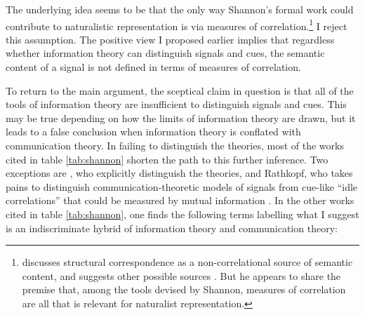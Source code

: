 \documentclass[12pt]{article}
\begin{document}


The underlying idea seems to be that the only way Shannon's formal work could contribute to naturalistic representation is via measures of correlation.\footnote{\citet[$\S$5]{shea2018representation} discusses structural correspondence as a non-correlational source of semantic content, and suggests other possible sources \citep[p. 76 n. 1]{shea2018representation}. But he appears to share the premise that, among the tools devised by Shannon, measures of correlation are all that is relevant for naturalist representation.}
I reject this assumption.
The positive view I proposed earlier implies that regardless whether information theory can distinguish signals and cues, the semantic content of a signal is not defined in terms of measures of correlation.

To return to the main argument, the sceptical claim in question is that all of the tools of information theory are insufficient to distinguish signals and cues.
This may be true depending on how the limits of information theory are drawn, but it leads to a false conclusion when information theory is conflated with communication theory.
In failing to distinguish the theories, most of the works cited in table \ref{tab:shannon} shorten the path to this further inference.
Two exceptions are \citet[17-20]{piccinini2011information}, who explicitly distinguish the theories, and Rathkopf, who takes pains to distinguish communication-theoretic models of signals from cue-like ``idle correlations'' that could be measured by mutual information \citep[p. 324 passim]{rathkopf2017neural}.
In the other works cited in table \ref{tab:shannon}, one finds the following terms labelling what I suggest is an indiscriminate hybrid of information theory and communication theory:
\end{document}
